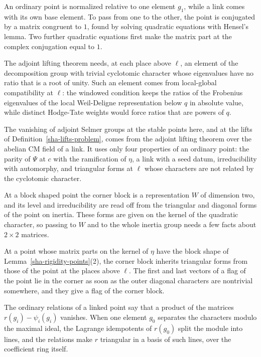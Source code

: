 An ordinary point is normalized relative to one element $g_1$, while a link comes with its own base element. To pass from one to the other, the point is conjugated by a matrix congruent to $1$, found by solving quadratic equations with Hensel's lemma. Two further quadratic equations first make the matrix part at the complex conjugation equal to $1$.

The adjoint lifting theorem needs, at each place above $\ell$, an element of the decomposition group with trivial cyclotomic character whose eigenvalues have no ratio that is a root of unity. Such an element comes from local-global compatibility at $\ell$: the windowed condition keeps the ratios of the Frobenius eigenvalues of the local Weil-Deligne representation below $q$ in absolute value, while distinct Hodge-Tate weights would force ratios that are powers of $q$.

The vanishing of adjoint Selmer groups at the stable points here, and at the lifts of Definition~\ref{sha-lifts-problem}, comes from the adjoint lifting theorem over the abelian CM field of a link. It uses only four properties of an ordinary point: the parity of $\Psi$ at $c$ with the ramification of $\eta$, a link with a seed datum, irreducibility with automorphy, and triangular forms at $\ell$ whose characters are not related by the cyclotomic character.

At a block shaped point the corner block is a representation $W$ of dimension two, and its level and irreducibility are read off from the triangular and diagonal forms of the point on inertia. These forms are given on the kernel of the quadratic character, so passing to $W$ and to the whole inertia group needs a few facts about $2\times2$ matrices.

At a point whose matrix parts on the kernel of $\eta$ have the block shape of Lemma~\ref{sha-rigidity-points}(2), the corner block inherits triangular forms from those of the point at the places above $\ell$. The first and last vectors of a flag of the point lie in the corner as soon as the outer diagonal characters are nontrivial somewhere, and they give a flag of the corner block.

The ordinary relations of a linked point say that a product of the matrices $r(g_i)-\psi_i(g_i)$ vanishes. When one element $g_0$ separates the characters modulo the maximal ideal, the Lagrange idempotents of $r(g_0)$ split the module into lines, and the relations make $r$ triangular in a basis of such lines, over the coefficient ring itself.

